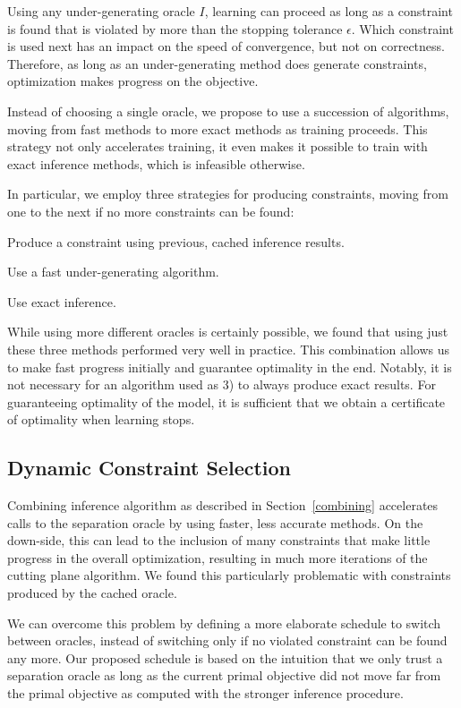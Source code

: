 Using any under-generating oracle $I$, learning can proceed as long as a
constraint is found that is violated by more than the stopping tolerance
$\epsilon$.  Which constraint is used next has an impact on the speed of
convergence, but not on correctness. Therefore, as long as an under-generating
method does generate constraints, optimization makes progress on the objective.

Instead of choosing a single oracle, we propose to use a succession of
algorithms, moving from fast methods to more exact methods as training
proceeds. This strategy not only accelerates training, it even makes it
possible to train with exact inference methods, which is infeasible otherwise.

In particular, we employ three strategies for producing constraints,
moving from one to the next if no more constraints can be found:
\begin{enumerate*}
    \item Produce a constraint using previous, cached inference results.
    \item Use a fast under-generating algorithm.
    \item Use exact inference.
\end{enumerate*}

While using more different oracles is certainly possible, we found
that using just these three methods performed very well in practice.  This
combination allows us to make fast progress initially and guarantee optimality
in the end.
Notably, it is not necessary for an algorithm used as 3) to always produce
exact results. For guaranteeing optimality of the model, it is sufficient that
we obtain a certificate of optimality when learning stops.

\subsection{Dynamic Constraint Selection}\label{caching}
Combining inference algorithm as described in Section~\ref{combining}
accelerates calls to the separation oracle by using faster, less accurate
methods. On the down-side, this can lead to the inclusion of many constraints
that make little progress in the overall optimization, resulting in much more
iterations of the cutting plane algorithm. We found this particularly problematic
with constraints produced by the cached oracle.

We can overcome this problem by defining a more elaborate schedule to switch
between oracles, instead of switching only if no violated constraint can be
found any more. Our proposed schedule is based on the intuition that we only
trust a separation oracle as long as the current primal objective did not move
far from the primal objective as computed with the stronger inference
procedure.

